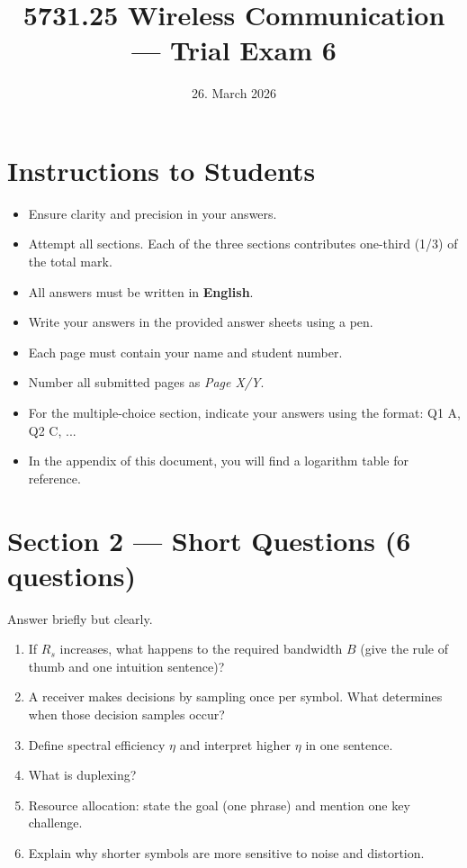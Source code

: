 \documentclass[11pt,a4paper]{article}
\begin{document}
\pagestyle{fancy}
\fancyhf{}
\renewcommand{\headrulewidth}{0pt}
\renewcommand{\footrulewidth}{0pt}
\fancyfoot[R]{\thepage/\pageref{LastPage}}
\fancypagestyle{plain}{
    \fancyhf{}
    \fancyfoot[R]{\thepage/\pageref{LastPage}}
    \renewcommand{\headrulewidth}{0pt}
    \renewcommand{\footrulewidth}{0pt}
}

\title{5731.25 Wireless Communication --- Trial Exam 6}
\date{26. March 2026}
\maketitle

\section*{Instructions to Students}
\begin{itemize}
    \item Ensure clarity and precision in your answers.
    \item Attempt all sections. Each of the three sections contributes one-third (1/3) of the total mark.
    \item All answers must be written in \textbf{English}.
    \item Write your answers in the provided answer sheets using a pen.
    \item Each page must contain your name and student number.
    \item Number all submitted pages as \textit{Page X/Y}.
    \item For the multiple-choice section, indicate your answers using the format: Q1 A, Q2 C, ...
    \item In the appendix of this document, you will find a logarithm table for reference.
\end{itemize}

\newpage

\newpage

\section*{Section 2 --- Short Questions (6 questions)}
Answer briefly but clearly.

\begin{enumerate}[leftmargin=0.9cm]
\item If $R_s$ increases, what happens to the required bandwidth $B$ (give the rule of thumb and one intuition sentence)?

\item A receiver makes decisions by sampling once per symbol. What determines when those decision samples occur?

\item Define spectral efficiency $\eta$ and interpret higher $\eta$ in one sentence.

\item What is duplexing?

\item Resource allocation: state the goal (one phrase) and mention one key challenge.

\item Explain why shorter symbols are more sensitive to noise and distortion.
\end{enumerate}
\end{document}
